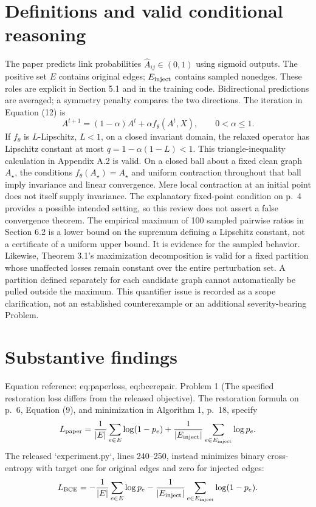 \documentclass[10pt]{article}
\begin{document}
\section*{Definitions and valid conditional reasoning}
The paper predicts link probabilities \(\widehat A_{ij}\in(0,1)\) using sigmoid outputs. The positive set \(E\) contains original edges; \(E_{\rm inject}\) contains sampled nonedges. These roles are explicit in Section 5.1 and in the training code. Bidirectional predictions are averaged; a symmetry penalty compares the two directions. The iteration in Equation (12) is \[A^{t+1}=(1-\alpha)A^t+\alpha f_\theta(A^t,X),\qquad 0<\alpha\leq1.\] If \(f_\theta\) is \(L\)-Lipschitz, \(L<1\), on a closed invariant domain, the relaxed operator has Lipschitz constant at most \(q=1-\alpha(1-L)<1\). This triangle-inequality calculation in Appendix A.2 is valid. On a closed ball about a fixed clean graph \(A_\star\), the conditions \(f_\theta(A_\star)=A_\star\) and uniform contraction throughout that ball imply invariance and linear convergence. Mere local contraction at an initial point does not itself supply invariance. The explanatory fixed-point condition on p. 4 provides a possible intended setting, so this review does not assert a false convergence theorem. The empirical maximum of 100 sampled pairwise ratios in Section 6.2 is a lower bound on the supremum defining a Lipschitz constant, not a certificate of a uniform upper bound. It is evidence for the sampled behavior. Likewise, Theorem 3.1’s maximization decomposition is valid for a fixed partition whose unaffected losses remain constant over the entire perturbation set. A partition defined separately for each candidate graph cannot automatically be pulled outside the maximum. This quantifier issue is recorded as a scope clarification, not an established counterexample or an additional severity-bearing Problem.\par
\section*{Substantive findings}
Equation reference: eq:paperloss, eq:bcerepair. Problem 1 (The specified restoration loss differs from the released objective).  The restoration formula on p. 6, Equation (9), and minimization in Algorithm 1, p. 18, specify \[
L_{\rm paper}=\frac1{|E|}\sum_{e\in E}\log(1-p_e)
+\frac1{|E_{\rm inject}|}\sum_{e\in E_{\rm inject}}\log p_e.\] The released `experiment.py`, lines 240–250, instead minimizes binary cross-entropy with target one for original edges and zero for injected edges: \[
L_{\rm BCE}=-\frac1{|E|}\sum_{e\in E}\log p_e
-\frac1{|E_{\rm inject}|}\sum_{e\in E_{\rm inject}}\log(1-p_e).\]\par
\end{document}
